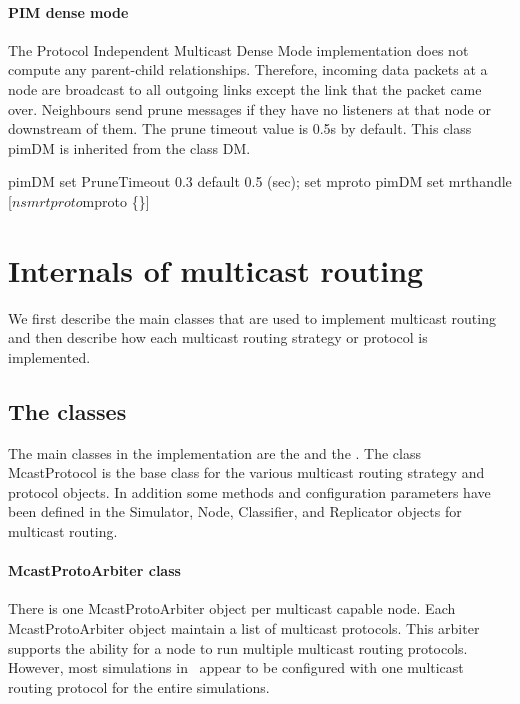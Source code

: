 \paragraph{PIM dense mode}
The Protocol Independent Multicast Dense Mode implementation
does not compute any parent-child relationships.
Therefore, incoming  data packets at a node are broadcast
to all outgoing links except the link that the packet came over.
Neighbours send prune messages if they have no listeners
at that node or downstream of them.
The prune timeout value is 0.5s by default.
This class pimDM is inherited from the class DM.
\begin{program}
        pimDM set PruneTimeout  0.3     \; default 0.5 (sec);
        set mproto pimDM
        set mrthandle [$ns mrtproto $mproto \{\}]
\end{program}

\section{Internals of multicast routing}
\label{sec:mcast-internals}

We first describe the main classes that are used to implement multicast
routing and then describe how each multicast routing strategy
or protocol is implemented.

\subsection{The classes}
The main classes in the implementation are
the  and
the .
The class McastProtocol is the base
class for the various multicast routing strategy and protocol objects.
In addition some methods and configuration parameters have been defined in
the Simulator, Node, Classifier, and Replicator objects for multicast
routing.

\paragraph{McastProtoArbiter class}
There is one McastProtoArbiter object per multicast capable node.
Each  McastProtoArbiter object maintain a list of multicast protocols.
This arbiter supports the ability for a node to run multiple multicast
routing protocols.
However, most simulations in \ns\ appear to be
configured with one multicast routing protocol for the entire simulations.

